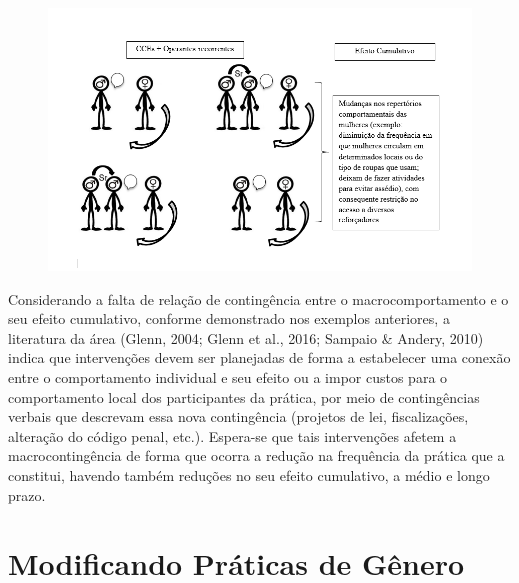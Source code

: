 \begin{figure}[ht]
    \begin{center}
        \includegraphics[width=1\textwidth]{7/figura4}
        \label{figura4}
\end{center}
\end{figure}

Considerando a falta de relação de contingência entre o macrocomportamento e o seu efeito cumulativo, conforme demonstrado nos exemplos anteriores, a literatura da área (Glenn, 2004; Glenn et al., 2016; Sampaio \& Andery, 2010) indica que intervenções devem ser planejadas de forma a estabelecer uma conexão entre o comportamento individual e seu efeito ou a impor custos para o comportamento local dos participantes da prática, por meio de contingências verbais que descrevam essa nova contingência (projetos de lei, fiscalizações, alteração do código penal, etc.). Espera-se que tais intervenções afetem a macrocontingência de forma que ocorra a redução na frequência da prática que a constitui, havendo também reduções no seu efeito cumulativo, a médio e longo prazo.

\section*{Modificando Práticas de Gênero}

